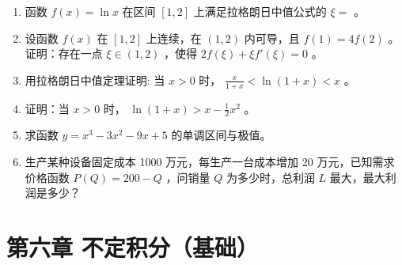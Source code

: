 \documentclass[12pt, a4paper]{article}
\begin{document}
\begin{enumerate}
    \item 函数 $ f(x)=\ln x $ 在区间 $[1,2]$ 上满足拉格朗日中值公式的 $ \xi= $ \underline{\hspace{2cm}}。

    \item 设函数 $ f(x) $ 在 $ [1,2] $ 上连续，在 $ (1,2) $ 内可导，且 $ f(1) = 4f(2) $ 。
    证明：存在一点 $ \xi \in (1,2) $ ，使得 $ 2f(\xi) + \xi f'(\xi) = 0 $ 。

    \item 用拉格朗日中值定理证明: 当 $x>0$ 时， $ \frac{x}{1+x}<\ln(1+x)<x $ 。

    \item 证明：当 $x>0$ 时， $ \ln(1+x)>x-\frac{1}{2}x^{2} $ 。

    \item 求函数 $ y = x^{3} - 3x^{2} - 9x + 5 $ 的单调区间与极值。

    \item 生产某种设备固定成本 1000 万元，每生产一台成本增加 20 万元，已知需求价格函数 $ P(Q) = 200 - Q $ ，问销量 $Q$ 为多少时，总利润 $L$ 最大，最大利润是多少？
\end{enumerate}

\section*{第六章 不定积分（基础）}
\end{document}
